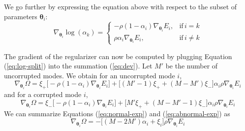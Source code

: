 We go further by expressing the equation above with respect to the subset of parameters $\bm{\theta}_i$:
\begin{equation}
\nabla_{\bm{\theta}_i}  \log(\alpha_k) = \begin{cases}
      -\rho(1-\alpha_i)\nabla_{\bm{\theta}_i}E_i, & \text{if}\, i = k \\
       \rho\alpha_i\nabla_{\bm{\theta}_i}E_i, & \text{if}\, i \neq k
    \end{cases}
\label{eq:log-split}
\end{equation}

The gradient of the regularizer can now be computed by plugging Equation (\ref{eq:log-split}) into the summation (\ref{eq:dev}). Let $M'$ be the number of uncorrupted modes. We obtain for an uncorrupted mode $i$,
\begin{equation}
\nabla_{\bm{\theta}_i}\Omega = \xi_+\big[ -\rho(1-\alpha_i)\nabla_{\bm{\theta}_i}E_i \big] + \big[(M'-1)\xi_+ + (M-M')\xi_-\big]\alpha_i\rho\nabla_{\bm{\theta}_i}E_i
\label{eq:normal-exp}
\end{equation}
and for a corrupted mode $i$,
\begin{equation}
\nabla_{\bm{\theta}_i}\Omega =\xi_-\big[ -\rho(1-\alpha_i)\nabla_{\bm{\theta}_i}E_i \big] + \big[M'\xi_+ + (M-M'-1)\xi_-\big]\alpha_i\rho\nabla_{\bm{\theta}_i}E_i
\label{eq:abnormal-exp}
\end{equation}
We can summarize Equations (\ref{eq:normal-exp}) and (\ref{eq:abnormal-exp}) as
\begin{equation}
\boxed{\nabla_{\bm{\theta}_i}\Omega = -\big[(M-2M')\alpha_i + \xi_i\big]\rho\nabla_{\bm{\theta}_i}E_i}
\end{equation}


